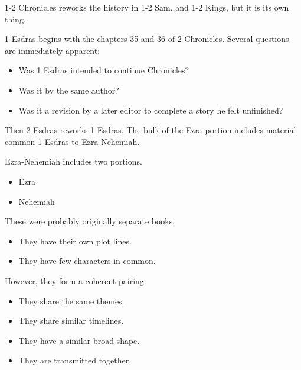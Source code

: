 \documentclass{beamer}
\begin{document}
\begin{frame}
  1-2 Chronicles reworks the history in 1-2 Sam. and 1-2 Kings, but it is its own thing.
\end{frame}

\begin{frame}
  1 Esdras begins with the chapters 35 and 36 of 2 Chronicles.
  Several questions are immediately apparent:\pause
  \begin{itemize}
	\item Was 1 Esdras intended to continue Chronicles?\pause
	\item Was it by the same author?\pause
	\item Was it a revision by a later editor to complete a story he felt unfinished?
  \end{itemize}
\end{frame}

\begin{frame}
  Then 2 Esdras reworks 1 Esdras.
  The bulk of the Ezra portion includes material common 1 Esdras to Ezra-Nehemiah.
\end{frame}

\begin{frame}
  Ezra-Nehemiah includes two portions.
  \begin{itemize}
	\item Ezra
	\item Nehemiah
  \end{itemize}
\end{frame}

\begin{frame}
  These were probably originally separate books.\pause
  \begin{itemize}
	\item They have their own plot lines.\pause
	\item They have few characters in common.
  \end{itemize}
\end{frame}

\begin{frame}
  However, they form a coherent pairing:\pause
  \begin{itemize}
	\item They share the same themes.\pause
	\item They share similar timelines.\pause
	\item They have a similar broad shape.\pause
	\item They are transmitted together.
  \end{itemize}
\end{frame}
\end{document}
